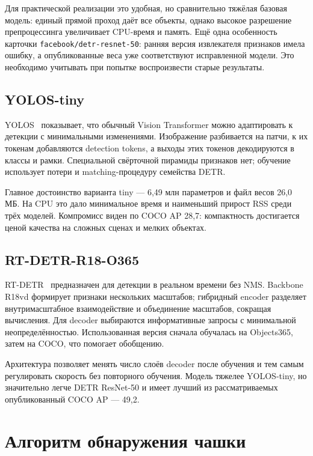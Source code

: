 \documentclass[a4paper,12pt]{extreport}
\newcommand{\code}[1]{\nolinkurl{#1}}
\begin{document}
Для практической реализации это удобная, но сравнительно тяжёлая базовая модель: единый прямой проход даёт все объекты, однако высокое разрешение препроцессинга увеличивает CPU-время и память. Ещё одна особенность карточки \code{facebook/detr-resnet-50}: ранняя версия извлекателя признаков имела ошибку, а опубликованные веса уже соответствуют исправленной модели. Это необходимо учитывать при попытке воспроизвести старые результаты.

\subsection{YOLOS-tiny}

YOLOS~\cite{fang} показывает, что обычный Vision Transformer можно адаптировать к детекции с минимальными изменениями. Изображение разбивается на патчи, к их токенам добавляются detection tokens, а выходы этих токенов декодируются в классы и рамки. Специальной свёрточной пирамиды признаков нет; обучение использует потери и matching-процедуру семейства DETR.

Главное достоинство варианта tiny --- 6,49 млн параметров и файл весов 26,0 МБ. На CPU это дало минимальное время и наименьший прирост RSS среди трёх моделей. Компромисс виден по COCO AP 28,7: компактность достигается ценой качества на сложных сценах и мелких объектах.

\subsection{RT-DETR-R18-O365}

RT-DETR~\cite{zhao} предназначен для детекции в реальном времени без NMS. Backbone R18vd формирует признаки нескольких масштабов; гибридный encoder разделяет внутримасштабное взаимодействие и объединение масштабов, сокращая вычисления. Для decoder выбираются информативные запросы с минимальной неопределённостью. Использованная версия сначала обучалась на Objects365, затем на COCO, что помогает обобщению.

Архитектура позволяет менять число слоёв decoder после обучения и тем самым регулировать скорость без повторного обучения. Модель тяжелее YOLOS-tiny, но значительно легче DETR ResNet-50 и имеет лучший из рассматриваемых опубликованный COCO AP --- 49,2.

\section{Алгоритм обнаружения чашки}
\end{document}
